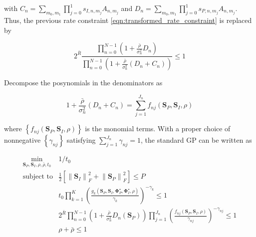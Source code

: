 with ${C_n} = \sum\nolimits_{{m_0},{m_1}} {\prod\nolimits_{j = 0}^1 {{s_{I,n,{m_j}}}{A_{n,{m_j}}}} } $ and ${D_n} = \sum\nolimits_{{m_0},{m_1}} {\prod\nolimits_{j = 0}^1 {{s_{P,n,{m_j}}}{A_{n,{m_j}}}} } $. Thus, the previous rate constraint \eqref{eqn:transformed_rate_constraint} is replaced by

\begin{equation}\label{eqn:transformed_rate_constraint_lower_bound}
  {2^{\bar R}}\frac{{\prod\limits_{n = 0}^{N - 1} {\left( {1 + \frac{{\bar \rho }}{{\sigma _n^2}}{D_n}} \right)} }}{{\prod\limits_{n = 0}^{N - 1} {\left( {1 + \frac{{\bar \rho }}{{\sigma _n^2}}\left( {{D_n} + {C_n}} \right)} \right)} }} \leqslant 1
\end{equation}

Decompose the posynomials in the denominators as

\begin{equation}\label{eqn:posynomial_lower_bound}
  1 + \frac{{\bar \rho }}{{\sigma _n^2}}\left( {{D_n} + {C_n}} \right) = \sum\limits_{j = 1}^{{J_n}} {{f_{nj}}\left( {{{\mathbf{S}}_P},{{\mathbf{S}}_I},\rho } \right)}
\end{equation}

where $\left\{ {{f_{nj}}\left( {{{\mathbf{S}}_P},{{\mathbf{S}}_I},\rho } \right)} \right\}$ is the monomial terms. With a proper choice of nonnegative $\left\{ {{\gamma _{nj}}} \right\}$ satisfying $\sum\nolimits_{j = 1}^{{J_n}} {{\gamma _{nj}}}  = 1$, the standard GP can be written as

\begin{eqnarray}
  {\mathop {\min }\limits_{{{\mathbf{S}}_P},{{\mathbf{S}}_I},\rho ,\bar \rho ,{t_0}} }&{1/{t_0}} \label{eqn:lower_bound_target} \\
  {{\text{subject to}}}&{\frac{1}{2}\left[ {\left\| {{{\mathbf{S}}_I}} \right\|_F^2 + \left\| {{{\mathbf{S}}_P}} \right\|_F^2} \right] \leqslant P} \label{eqn:lower_bound_power_constraint} \\
  {}&{{t_0}\prod\limits_{k = 1}^K {{{\left( {\frac{{{g_k}\left( {{{\mathbf{S}}_P},{{\mathbf{S}}_I},{\mathbf{\Phi }}_P^ \star ,{\mathbf{\Phi }}_I^ \star ,\rho } \right)}}{{{\gamma _k}}}} \right)}^{ - {\gamma _k}}}}  \leqslant 1} \label{eqn:lower_bound_current_constraint} \\
  {}&{{2^{\bar R}}\prod\limits_{n = 0}^{N - 1} {\left( {1 + \frac{{\bar \rho }}{{\sigma _n^2}}{D_n}\left( {{{\mathbf{S}}_P}} \right)} \right)} \prod\limits_{j = 1}^{{J_n}} {{{\left( {\frac{{{f_{nj}}\left( {{{\mathbf{S}}_P},{{\mathbf{S}}_I},\rho } \right)}}{{{\gamma _{nj}}}}} \right)}^{ - {\gamma _{nj}}}}}  \leqslant 1} \label{eqn:lower_bound_rate_constraint} \\
  {}&{\rho  + \bar \rho  \leqslant 1 \label{eqn:lower_bound_ratio_constraint}}
\end{eqnarray}

